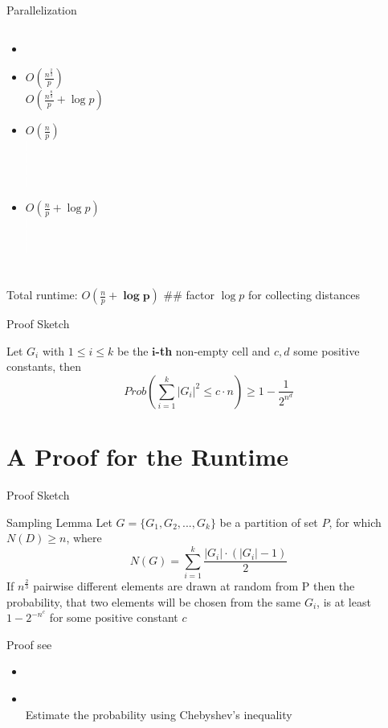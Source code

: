 \documentclass[18pt]{beamer}
\begin{document}
\begin{frame}{Parallelization}
\begin{columns}
		\begin{itemize}\itemsep0pt
			\item[]  
			\vspace{8pt}
			\item[]$O(\frac{n^{\frac{2}{3}}}{p})$\\ $O(\frac{n^{\frac{8}{9}}}{p} + \log p)$ \\ 					
			\item[]$O(\frac{n}{p})$\\\textcolor{white}{$|$} \\\textcolor{white}{$|$} \\ \textcolor{white}{$|$}\\  \textcolor{white}{$|$}\\
			\item[]$O(\frac{n}{p} + \log p)$\\\textcolor{white}{$|$} \\ \textcolor{white}{$|$} \\\textcolor{white}{$|$}\\
		\end{itemize}
\end{columns}
\vspace{2ex}
Total runtime: $O(\frac{n}{p} + \boldsymbol{\log p})$ \alert{\#\# factor $\log p$ for collecting distances}
\end{frame}


\begin{frame}{Proof Sketch}
	\begin{theorem}
		Let $G_i$ with $1\leq i \leq k$ be the \textbf{$\boldsymbol{i}$-th} non-empty cell and $c, d$ some positive constants, then 
	$$Prob\left(\sum_{i=1}^k |G_i|^2 \leq c \cdot n \right) \geq  1 - \frac{1}{2^{n^d}}$$
	\end{theorem}
\end{frame}

\section{A Proof for the Runtime}
\begin{frame}{Proof Sketch}
\begin{block}{Sampling Lemma}
Let $G = \{G_1, G_2,...,G_k\}$ be a partition of set $P$, for which $N(D) \geq n$, where
$$N(G) = \sum_{i=1}^k \frac{|G_i|\cdot (|G_i| - 1)}{2}$$ 
If $n^{\frac{2}{3}}$ pairwise different elements are drawn at random from P then the probability, that two elements will be chosen from the same $G_i$, is at least $1 - 2^{-n^c}$ for some positive constant $c$
\end{block}
Proof see
\begin{itemize}

\item \textbf{\cite{major}}
\item \textbf{\cite{dietzfelbinger1997reliable}} \\\hspace{2em}Estimate the probability using Chebyshev’s inequality
\end{itemize}

\end{frame}
\end{document}
